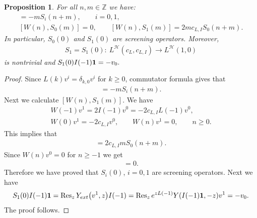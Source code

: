 \documentclass[11pt]{article}
\numberwithin{equation}{section}
\newtheorem{Proposition}[Theorem]{Proposition}
 { \theoremstyle{definition}
\newtheorem{Example}[Theorem]{Example}
\newtheorem{Remark}[Theorem]{Remark} }
\newcommand{\Z}{\mathbb Z}
\newcommand{\HVir}{\mathcal H}
\begin{document}
\begin{Proposition}
For all $n,m\in \Z$ we have:
\begin{gather*}
[L(n), S_i (m)] = - m S_i (n+m), \qquad i=0,1,\\
[W(n), S_0 (m) ] = 0, \qquad [W(n), S_1(m) ] = 2 m c_{L,I} S_0( n+m).
\end{gather*}
In particular, $S_0 (0) $ and $S_1(0)$ are screening operators. Moreover,
\begin{gather*}
S_1= S_1(0) \colon \ L^{\HVir} (c_L, c_{L,I}) \rightarrow L^{\HVir} (1,0)
\end{gather*}
is nontrivial and $ S_1 (0) I(-1) {\bf 1} = - v_0. $
\end{Proposition}

\begin{proof} Since $L(k) v^{i} = \delta_{k,0} v^{i}$ for $k \ge 0$, commutator formula gives that
\begin{gather*}
[L(n), S_i(m)] = - m S_i (n+m).
\end{gather*}
Next we calculate $[W(n), S_1 (m)]$. We have
\begin{gather*}
W(-1) v^1 = 2 I(-1) v^0 = - 2 c_{L,I} L(-1) v^0, \\
W(0) v^1 = - 2 c_{L,I} v^ 0, \qquad W(n) v^1 = 0, \qquad n \ge 0.
\end{gather*}
This implies that
\begin{gather*}
[W(n), S_1 (m) ] = 2 c_{L,I} m S_0 (n+m).
\end{gather*}
Since $W(n) v^0 = 0$ for $n \ge -1$ we get
\begin{gather*}
[ W(n), S_0 (m) ] = 0.
\end{gather*}
Therefore we have proved that $S_i(0)$, $i= 0,1$ are screening operators. Next we have
\begin{gather*}
S_1(0) I(-1) {\bf 1} = \operatorname{Res}_z Y_{\rm ext}\big(v^1, z\big) I(-1) = \operatorname{Res}_z e ^{z L(-1)} Y( I(-1) {\bf 1}
,- z) v^1 = - v_0.
\end{gather*}
The proof follows.
\end{proof}
\end{document}
